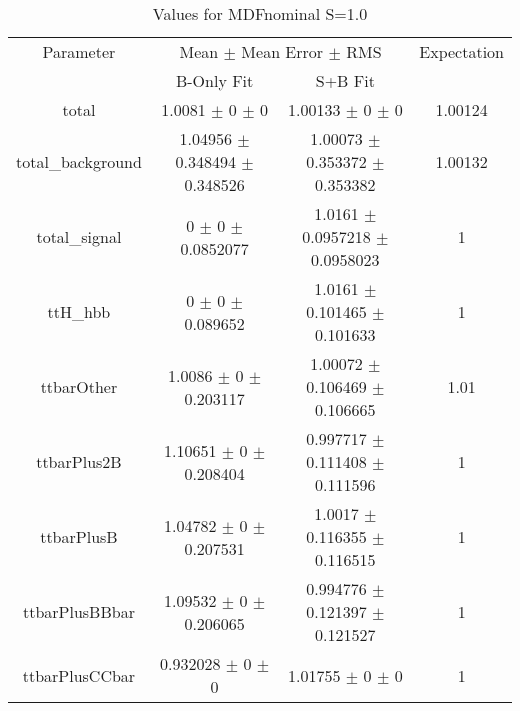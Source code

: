 \begin{table}
\centering
\caption{Values for MDFnominal S=1.0}
\begin{tabular}{cccc}
\toprule
Parameter & \multicolumn{2}{c}{Mean $\pm$ Mean Error $\pm$ RMS} & Expectation\\
 & B-Only Fit & S+B Fit & \\
\midrule
total & \num{1.0081} $\pm$ \num{0} $\pm$ \num{0} & \num{1.00133} $\pm$ \num{0} $\pm$ \num{0} & \num{1.00124}\\
total\_background & \num{1.04956} $\pm$ \num{0.348494} $\pm$ \num{0.348526} & \num{1.00073} $\pm$ \num{0.353372} $\pm$ \num{0.353382} & \num{1.00132}\\
total\_signal & \num{0} $\pm$ \num{0} $\pm$ \num{0.0852077} & \num{1.0161} $\pm$ \num{0.0957218} $\pm$ \num{0.0958023} & \num{1}\\
ttH\_hbb & \num{0} $\pm$ \num{0} $\pm$ \num{0.089652} & \num{1.0161} $\pm$ \num{0.101465} $\pm$ \num{0.101633} & \num{1}\\
ttbarOther & \num{1.0086} $\pm$ \num{0} $\pm$ \num{0.203117} & \num{1.00072} $\pm$ \num{0.106469} $\pm$ \num{0.106665} & \num{1.01}\\
ttbarPlus2B & \num{1.10651} $\pm$ \num{0} $\pm$ \num{0.208404} & \num{0.997717} $\pm$ \num{0.111408} $\pm$ \num{0.111596} & \num{1}\\
ttbarPlusB & \num{1.04782} $\pm$ \num{0} $\pm$ \num{0.207531} & \num{1.0017} $\pm$ \num{0.116355} $\pm$ \num{0.116515} & \num{1}\\
ttbarPlusBBbar & \num{1.09532} $\pm$ \num{0} $\pm$ \num{0.206065} & \num{0.994776} $\pm$ \num{0.121397} $\pm$ \num{0.121527} & \num{1}\\
ttbarPlusCCbar & \num{0.932028} $\pm$ \num{0} $\pm$ \num{0} & \num{1.01755} $\pm$ \num{0} $\pm$ \num{0} & \num{1}\\
\bottomrule
\end{tabular}
\end{table}